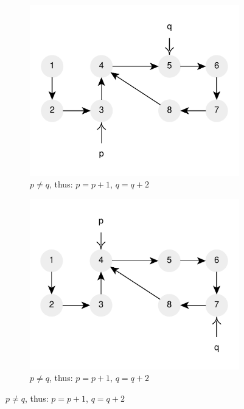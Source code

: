 \begin{figure}
\begin{subfigure}[t]{0.36\textwidth}
		\label{fig:cycle_in_list:floyd2}
	 \end{subfigure}
	 \hfill
	 \begin{subfigure}[l]{0.36\textwidth}
		\includegraphics[width=1\linewidth]{sources/cycle_in_list/images/floyd3}
		\caption{$p \neq q$,  thus: $p=p+1$, $q=q+2$}
		\label{fig:cycle_in_list:floyd3}
	 \end{subfigure}
	 \hfill
	 \begin{subfigure}[l]{0.36\textwidth}
		\includegraphics[width=1\linewidth]{sources/cycle_in_list/images/floyd4}
		\caption{$p \neq q$,  thus: $p=p+1$, $q=q+2$}

\end{subfigure}
\end{figure}
